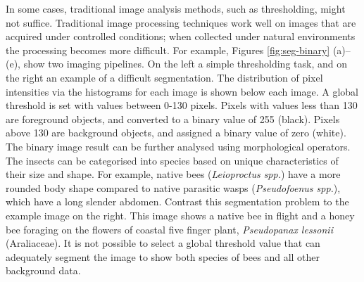 In some cases, traditional image analysis methods, such as thresholding, might not suffice. Traditional image processing techniques work well on images that are acquired under controlled conditions; when collected under natural environments the processing becomes more difficult. For example, Figures \ref{fig:seg-binary} (a)--(e), show two imaging pipelines. On the left a simple thresholding task, and on the right an example of a difficult segmentation. The distribution of pixel intensities via the histograms for each image is shown below each image. A global threshold is set with values between 0-130 pixels. Pixels with values less than 130 are foreground objects, and converted to a binary value of 255 (black). Pixels above 130 are background objects, and assigned a binary value of zero (white). The binary image result can be further analysed using morphological operators. The insects can be categorised into species based on unique characteristics of their size and shape. For example, native bees (\emph{Leioproctus spp.}) have a more rounded body shape compared to native parasitic wasps (\emph{Pseudofoenus spp.}), which have a long slender abdomen. Contrast this segmentation problem to the example image on the right. This image shows a native bee in flight and a honey bee foraging on the flowers of coastal five finger plant, \emph{Pseudopanax lessonii} (Araliaceae). It is not possible to select a global threshold value that can adequately segment the image to show both species of bees and all other background data. 

